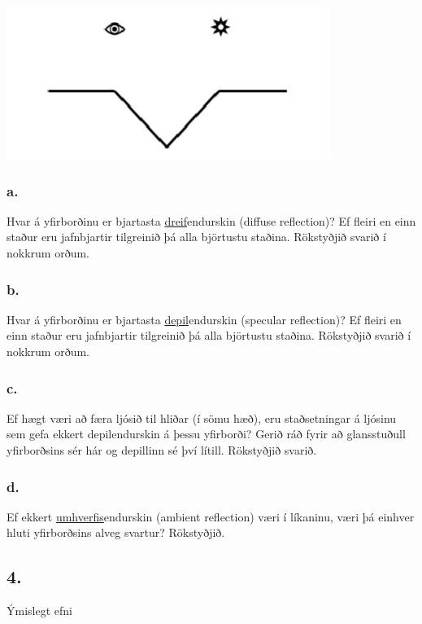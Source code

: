 \documentclass{article}
\begin{document}
\begin{center}
\includegraphics[scale = 0.9]{Endurskin.png}
\end{center}


\subsubsection{a.}Hvar á yfirborðinu er bjartasta \underline{dreif}endurskin (diffuse reflection)? Ef fleiri en
einn staður eru jafnbjartir tilgreinið þá alla björtustu staðina. Rökstyðjið
svarið í nokkrum orðum.

\subsubsection{b.}Hvar á yfirborðinu er bjartasta \underline{depil}endurskin (specular reflection)? Ef fleiri
en einn staður eru jafnbjartir tilgreinið þá alla björtustu staðina. Rökstyðjið
svarið í nokkrum orðum.

\subsubsection{c.}Ef hægt væri að færa ljósið til hliðar (í sömu hæð), eru staðsetningar á ljósinu
sem gefa ekkert depilendurskin á þessu yfirborði? Gerið ráð fyrir að
glansstuðull yfirborðsins sér hár og depillinn sé því lítill. Rökstyðjið svarið.

\subsubsection{d.}Ef ekkert \underline{umhverfis}endurskin (ambient reflection) væri í líkaninu, væri þá
einhver hluti yfirborðsins alveg svartur? Rökstyðjið.

\newpage

\subsection{4.} Ýmislegt efni
\end{document}
